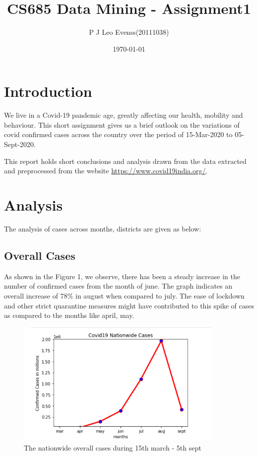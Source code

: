 \documentclass{article}
\title{CS685 Data Mining - Assignment1}
\author{P J Leo Evenss(20111038) }
\date{\today}
\begin{document}
\maketitle

\section{Introduction}
\vspace{0.5cm} 
\hspace{2cm} We live in a Covid-19 pandemic age, greatly affecting our health, mobility and behaviour. This short assignment gives us a brief outlook on the variations of covid confirmed cases across the country over the period of 15-Mar-2020 to 05-Sept-2020. \newline

\hspace{2cm} This report holds short conclusions and analysis drawn from the data extracted and preprocessed from the website \url{https://www.covid19india.org/}.



\section{Analysis}
\vspace{0.5cm} 
\hspace{2cm}The analysis of cases across months, districts are given as below:
\subsection{Overall Cases}
\vspace{0.5cm}
\hspace{2cm}As shown in the Figure 1, we observe, there has been a steady increase in the number of confirmed cases from the month of june. The graph indicates an overall increase of 78\% in august when compared to july. The ease of lockdown and other strict quarantine measures might have contributed to this spike of cases as compared to the months like april, may.    
\begin{figure}[htp] 
    \centering
    \includegraphics[width=10cm]{overallcases.png}
    \caption{The nationwide overall cases during  15th march - 5th sept} 
    \label{fig:graph}
\end{figure}
\FloatBarrier
\end{document}
